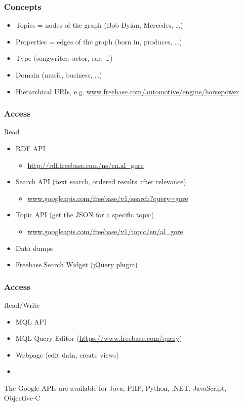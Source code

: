 \begin{frame}
\frametitle{Concepts}
\begin{itemize}
  \item Topics = nodes of the graph (Bob Dylan, Mercedes, \ldots)
  \item Properties = edges of the graph (born in, produces, \ldots)
  \item Type (songwriter, actor, car, \ldots)
  \item Domain (music, business, \ldots)
  \item Hierarchical URIs, e.g.
  \url{www.freebase.com/automotive/engine/horsepower}
\end{itemize}
\end{frame}

\begin{frame}
\frametitle{Access}
 Read
  \begin{itemize}
  \item RDF API
  \begin{itemize}
    \item  \url{http://rdf.freebase.com/ns/en.al_gore}
  \end{itemize}
  \item Search API (text search, ordered results after relevance)
  \begin{itemize}
    \item  \url{www.googleapis.com/freebase/v1/search?query=gore}
  \end{itemize}
  \item Topic API (get the JSON for a specific topic)
  \begin{itemize}
    \item  \url{www.googleapis.com/freebase/v1/topic/en/al_gore}
  \end{itemize}
  \item Data dumps
  \item Freebase Search Widget (jQuery plugin)
  \end{itemize}\end{frame}
  \begin{frame}
\frametitle{Access}
  Read/Write
  \begin{itemize}
  \item MQL API
  \item MQL Query Editor (\url{https://www.freebase.com/query})
  \item Webpage (edit data, create views)
  \item[]
  \end{itemize}
  The Google APIs are available for Java, PHP, Python, .NET, JavaScript,
  Objective-C
\end{frame}

